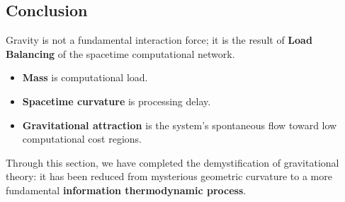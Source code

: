 \subsection{Conclusion}

Gravity is not a fundamental interaction force; it is the result of \textbf{Load Balancing} of the spacetime computational network.

\begin{itemize}
\item \textbf{Mass} is computational load.
\item \textbf{Spacetime curvature} is processing delay.
\item \textbf{Gravitational attraction} is the system's spontaneous flow toward low computational cost regions.
\end{itemize}

Through this section, we have completed the demystification of gravitational theory: it has been reduced from mysterious geometric curvature to a more fundamental \textbf{information thermodynamic process}.
